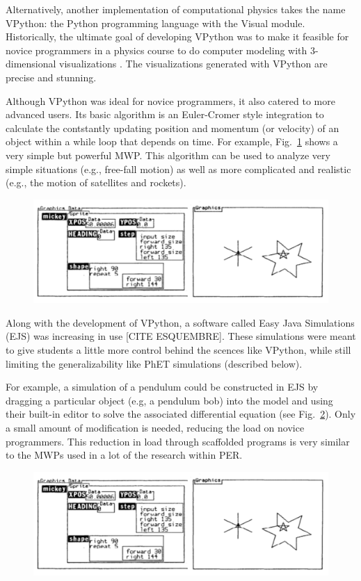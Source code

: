 \documentclass{msuphddissertation}
\begin{document}
\begin{doublespace}
Alternatively, another implementation of computational physics takes the name VPython: the Python programming language with the Visual module.  Historically, the ultimate goal of developing VPython was to make it feasible for novice programmers in a physics course to do computer modeling with 3-dimensional visualizations \cite{Sherer2000}.  The visualizations generated with VPython are precise and stunning.

Although VPython was ideal for novice programmers, it also catered to more advanced users.  Its basic algorithm is an Euler-Cromer style integration to calculate the contstantly updating position and momentum (or velocity) of an object within a while loop that depends on time.  For example, Fig.~\ref{CH2:MWP} shows a very simple but powerful MWP.  This algorithm can be used to analyze very simple situations (e.g., free-fall motion) as well as more complicated and realistic (e.g., the motion of satellites and rockets).

\begin{figure}
\includegraphics[scale=0.75]{images/CH2BOXER.pdf}
\caption{}\label{CH2:MWP}
\end{figure}

Along with the development of VPython, a software called Easy Java Simulations (EJS) was increasing in use [CITE ESQUEMBRE].  These simulations were meant to give students a little more control behind the scences like VPython, while still limiting the generalizability like PhET simulations (described below).

For example, a simulation of a pendulum could be constructed in EJS by dragging a particular object (e.g, a pendulum bob) into the model and using their built-in editor to solve the associated differential equation (see Fig.~\ref{CH2:EJS}).  Only a small amount of modification is needed, reducing the load on novice programmers.  This reduction in load through scaffolded programs is very similar to the MWPs used in a lot of the research within PER.

\begin{figure}
\includegraphics[scale=0.75]{images/CH2BOXER.pdf}
\caption{}\label{CH2:EJS}
\end{figure}


\end{doublespace}
\end{document}
